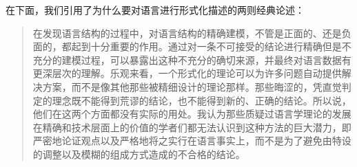 在下面，我们引用了为什么要对语言进行形式化描述的两则经典论述：
\begin{quote}
\label{quote-Chomsky-Formalisierung}%
在发现语言结构的过程中，对语言结构的精确建模，不管是正面的、还是负面的，都起到十分重要的作用。通过对一条不可接受的结论进行精确但是不充分的建模过程，可以暴露出这种不充分的确切来源，并最终对语言数据有更深层次的理解。乐观来看，一个形式化的理论可以为许多问题自动提供解决方案，而不是像其他那些被精细设计的理论那样。那些晦涩的，凭直觉判定的理念既不能得到荒谬的结论，也不能得到新的、正确的结论。所以说，他们在这两个方面都没有实际的用处。我认为那些质疑过语言学理论的发展在精确和技术层面上的价值的学者们都无法认识到这种方法的巨大潜力，即严密地论证观点以及严格地将之实行在语言事实上，而不是为了避免由特设的调整以及模糊的组成方式造成的不合格的结论。
\citep[]{Chomsky57a}
\end{quote}

